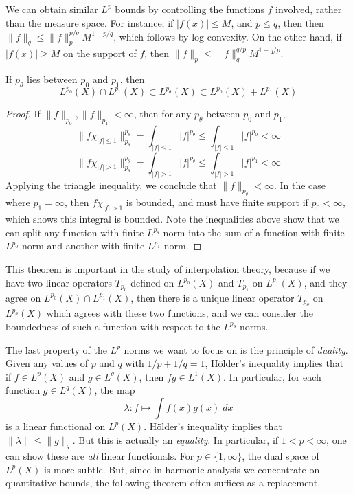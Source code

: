 \begin{example}
    We can obtain similar $L^p$ bounds by controlling the functions $f$ involved, rather than the measure space. For instance, if $|f(x)| \leq M$, and $p \leq q$, then then $\| f \|_q \leq \| f \|_p^{p/q} M^{1 - p/q}$, which follows by log convexity. On the other hand, if $|f(x)| \geq M$ on the support of $f$, then $\| f \|_p \leq \| f \|_q^{q/p} M^{1-q/p}$.
\end{example}

\begin{theorem}
  If $p_\theta$ lies between $p_0$ and $p_1$, then
  \[ L^{p_0}(X) \cap L^{p_1}(X) \subset L^{p_\theta}(X) \subset L^{p_0}(X) + L^{p_1}(X) \]
\end{theorem}
\begin{proof}
  If $\| f \|_{p_0}, \| f \|_{p_1} < \infty$, then for any $p_\theta$ between $p_0$ and $p_1$,
  \[ \| f \chi_{|f| \leq 1} \|_{p_\theta}^{p_\theta} = \int_{|f| \leq 1} |f|^{p_\theta} \leq \int_{|f| \leq 1} |f|^{p_0} < \infty \]
  \[ \| f \chi_{|f| > 1} \|_{p_\theta}^{p_\theta} = \int_{|f| > 1} |f|^{p_\theta} \leq \int_{|f| > 1} |f|^{p_1} < \infty \]
  Applying the triangle inequality, we conclude that $\| f \|_{p_\theta} < \infty$. In the case where $p_1 = \infty$, then $f \chi_{|f| > 1}$ is bounded, and must have finite support if $p_0 < \infty$, which shows this integral is bounded. Note the inequalities above show that we can split any function with finite $L^{p_\theta}$ norm into the sum of a function with finite $L^{p_0}$ norm and another with finite $L^{p_1}$ norm.
\end{proof}

\begin{remark}
  This theorem is important in the study of interpolation theory, because if we have two linear operators $T_{p_0}$ defined on $L^{p_0}(X)$ and $T_{p_1}$ on $L^{p_1}(X)$, and they agree on $L^{p_0}(X) \cap L^{p_1}(X)$, then there is a unique linear operator $T_{p_\theta}$ on $L^{p_\theta}(X)$ which agrees with these two functions, and we can consider the boundedness of such a function with respect to the $L^{p_\theta}$ norms.
\end{remark}

The last property of the $L^p$ norms we want to focus on is the principle of \emph{duality}. Given any values of $p$ and $q$ with $1/p + 1/q = 1$, H\"{o}lder's inequality implies that if $f \in L^p(X)$ and $g \in L^q(X)$, then $fg \in L^1(X)$. In particular, for each function $g \in L^q(X)$, the map
%
\[ \lambda: f \mapsto \int f(x)g(x)\; dx \]
%
is a linear functional on $L^p(X)$. H\"{o}lder's inequality implies that $\| \lambda \| \leq \| g \|_q$. But this is actually an \emph{equality}. In particular, if $1 < p < \infty$, one can show these are \emph{all} linear functionals. For $p \in \{ 1, \infty \}$, the dual space of $L^p(X)$ is more subtle. But, since in harmonic analysis we concentrate on quantitative bounds, the following theorem often suffices as a replacement.

